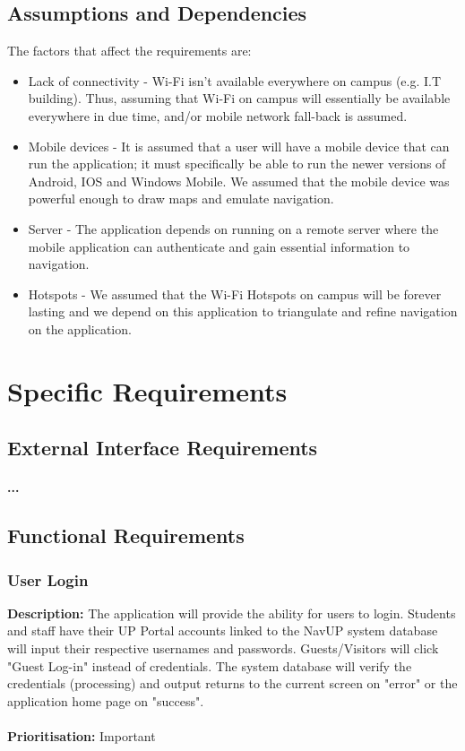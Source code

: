 \documentclass[runningheads,a4paper]{article}
\begin{document}
\subsection{Assumptions and Dependencies}
The factors that affect the requirements are:
\begin{itemize}
	 
		\item Lack of connectivity -  Wi-Fi isn't available everywhere on campus (e.g. I.T building). Thus, assuming that Wi-Fi on campus will essentially be available everywhere in due time, and/or mobile network fall-back is assumed.
		
		\item Mobile devices - It is assumed that a user will have a mobile device that can run the application; it must specifically be able to run the newer versions of Android, IOS and Windows Mobile. We assumed that the mobile device was powerful enough to draw maps and emulate navigation.
		\item Server - The application depends on running on a remote server where the mobile application can authenticate and gain essential information to navigation.
		
		\item Hotspots - We assumed that the Wi-Fi Hotspots on campus will be forever lasting and we depend on this application to triangulate and refine navigation on the application.
	 
\end{itemize}
 


\section{Specific Requirements}

\subsection{External Interface Requirements}
\paragraph{...}
\subsection{Functional Requirements}

\subsubsection{User Login}
\textbf{Description:}  The application will provide the ability for users to login. Students and staff have their UP Portal accounts linked to the NavUP system database will input their respective usernames and passwords. Guests/Visitors will click "Guest Log-in" instead of credentials. The system database will verify the credentials (processing) and output returns to the current screen on "error" or the application home page on "success".\\\\
\noindent
\textbf{Prioritisation:} Important\\
  
\end{document}
